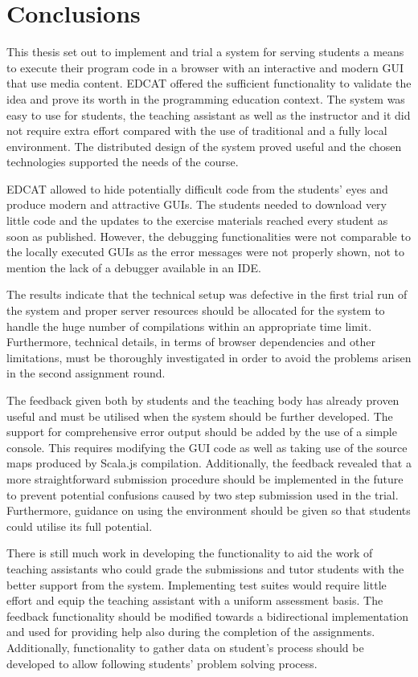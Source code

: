 \chapter{Conclusions}
\label{chapter:conclusions}

This thesis set out to implement and trial a system for serving students a means to execute their program code in a browser with an interactive and modern GUI that use media content. EDCAT offered the sufficient functionality to validate the idea and prove its worth in the programming education context. The system was easy to use for students, the teaching assistant as well as the instructor and it did not require extra effort compared with the use of traditional and a fully local environment. The distributed design of the system proved useful and the chosen technologies supported the needs of the course.

EDCAT allowed to hide potentially difficult code from the students' eyes and produce modern and attractive GUIs. The students needed to download very little code and the updates to the exercise materials reached every student as soon as published. However, the debugging functionalities were not comparable to the locally executed GUIs as the error messages were not properly shown, not to mention the lack of a debugger available in an IDE.

The results indicate that the technical setup was defective in the first trial run of the system and proper server resources should be allocated for the system to handle the huge number of compilations within an appropriate time limit. Furthermore, technical details, in terms of browser dependencies and other limitations, must be thoroughly investigated in order to avoid the problems arisen in the second assignment round.

The feedback given both by students and the teaching body has already proven useful and must be utilised when the system should be further developed. The support for comprehensive error output should be added by the use of a simple console. This requires modifying the GUI code as well as taking use of the source maps produced by Scala.js compilation. Additionally, the feedback revealed that a more straightforward submission procedure should be implemented in the future to prevent potential confusions caused by two step submission used in the trial. Furthermore, guidance on using the environment should be given so that students could utilise its full potential.

There is still much work in developing the functionality to aid the work of teaching assistants who could grade the submissions and tutor students with the better support from the system. Implementing test suites would require little effort and equip the teaching assistant with a uniform assessment basis. The feedback functionality should be modified towards a bidirectional implementation and used for providing help also during the completion of the assignments. Additionally, functionality to gather data on student's process should be developed to allow following students' problem solving process.

